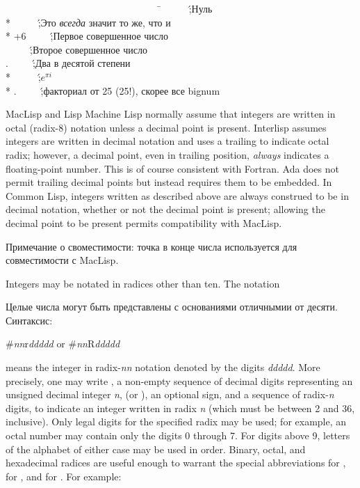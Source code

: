 \begin{lisp}
~~~~~~~~~~~~~~~~~~~~~~~~~~~~~~~~\=\kill
{}~~~~~\';{\rm Нуль} \\*
~~~~~\';{\rm Это {\it всегда} значит то же, что и } \\*
\>+6~~~~~\';{\rm Первое совершенное число} \\
~~~~~\';{\rm Второе совершенное число} \\
.~~~~~\';{\rm Два в десятой степени} \\*
~~~~~\';{\rm \(e^{\pi i}\)} \\*
.~~~~~\';{\rm факториал от 25 (25!),
скорее все bignum}
\end{lisp}

\beforenoterule
\begin{incompatibility}
MacLisp and Lisp Machine Lisp normally assume that integers
are written in octal (radix-8) notation unless a decimal
point is present.
Interlisp assumes integers are written in decimal notation and uses a
trailing  to indicate octal radix; however, a decimal point,
even in trailing position, {\it always} indicates a floating-point number.
This is of course consistent with Fortran.  Ada does not permit
trailing decimal points but instead requires them to be embedded.
In Common Lisp, integers written as described
above are always construed to be
in decimal notation, whether or not the decimal point is present;
allowing the decimal point to be present permits compatibility with
MacLisp.

Примечание о своместимости: точка в конце числа используется для
совместимости с MacLisp.
\end{incompatibility}
\afternoterule


Integers may be notated in radices other than ten.
The notation

Целые числа могут быть представлены с основаниями отличнымии от
десяти. Синтаксис: 
\begin{lisp}
\#{\it nn}r{\it ddddd}     {\rm or}     \#{\it nn}R{\it ddddd}
\end{lisp}
means the integer in radix-{\it nn} notation denoted by the digits
{\it ddddd}.  More precisely, one may write \cd{\#}, a non-empty sequence
of decimal digits representing an unsigned decimal integer {\it n},
 (or ), an optional sign, and a sequence of radix-{\it n}
digits, to indicate an integer written in radix {\it n} (which must be
between 2 and 36, inclusive).  Only legal digits
for the specified radix may be used; for example, an octal number may
contain only the digits 0 through 7.  For digits above 9,
letters of the alphabet of either
case may be used in order.  Binary, octal, and
hexadecimal radices are useful enough to warrant the special
abbreviations  for ,  for , and
 for .
For example:

